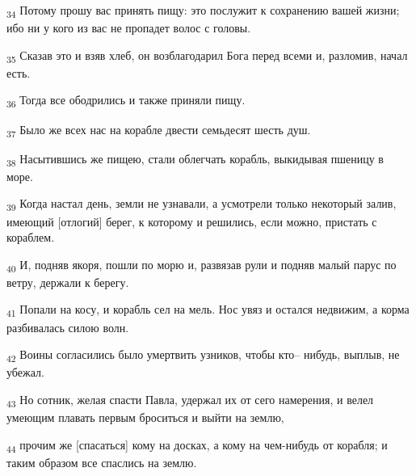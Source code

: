 \begin{tcolorbox}
\textsubscript{34} Потому прошу вас принять пищу: это послужит к сохранению вашей жизни; ибо ни у кого из вас не пропадет волос с головы.
\end{tcolorbox}
\begin{tcolorbox}
\textsubscript{35} Сказав это и взяв хлеб, он возблагодарил Бога перед всеми и, разломив, начал есть.
\end{tcolorbox}
\begin{tcolorbox}
\textsubscript{36} Тогда все ободрились и также приняли пищу.
\end{tcolorbox}
\begin{tcolorbox}
\textsubscript{37} Было же всех нас на корабле двести семьдесят шесть душ.
\end{tcolorbox}
\begin{tcolorbox}
\textsubscript{38} Насытившись же пищею, стали облегчать корабль, выкидывая пшеницу в море.
\end{tcolorbox}
\begin{tcolorbox}
\textsubscript{39} Когда настал день, земли не узнавали, а усмотрели только некоторый залив, имеющий [отлогий] берег, к которому и решились, если можно, пристать с кораблем.
\end{tcolorbox}
\begin{tcolorbox}
\textsubscript{40} И, подняв якоря, пошли по морю и, развязав рули и подняв малый парус по ветру, держали к берегу.
\end{tcolorbox}
\begin{tcolorbox}
\textsubscript{41} Попали на косу, и корабль сел на мель. Нос увяз и остался недвижим, а корма разбивалась силою волн.
\end{tcolorbox}
\begin{tcolorbox}
\textsubscript{42} Воины согласились было умертвить узников, чтобы кто-- нибудь, выплыв, не убежал.
\end{tcolorbox}
\begin{tcolorbox}
\textsubscript{43} Но сотник, желая спасти Павла, удержал их от сего намерения, и велел умеющим плавать первым броситься и выйти на землю,
\end{tcolorbox}
\begin{tcolorbox}
\textsubscript{44} прочим же [спасаться] кому на досках, а кому на чем-нибудь от корабля; и таким образом все спаслись на землю.
\end{tcolorbox}
